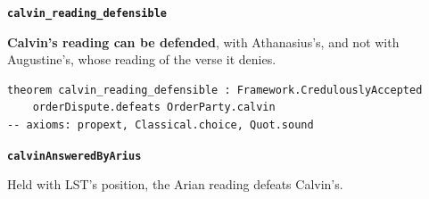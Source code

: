\documentclass[11pt,paper=\testimonypaper,DIV=13,parskip=false]{scrartcl}
\begin{document}
\par\medskip\noindent\textbf{\texttt{calvin\_\allowbreak{}reading\_\allowbreak{}defensible}}\par\nobreak\noindent
\textbf{Calvin’s reading can be defended}, with Athanasius’s, and not with Augustine’s, whose reading of the verse it denies.

{\small\begin{verbatim}
theorem calvin_reading_defensible : Framework.CredulouslyAccepted
    orderDispute.defeats OrderParty.calvin
-- axioms: propext, Classical.choice, Quot.sound
\end{verbatim}}
\par\medskip\noindent\textbf{\texttt{calvin\allowbreak{}Answered\allowbreak{}By\allowbreak{}Arius}}\par\nobreak\noindent
Held with LST’s position, the Arian reading defeats Calvin’s.
\end{document}
